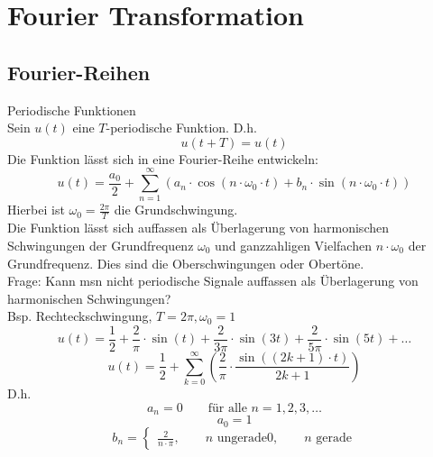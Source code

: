 



\chapter{Fourier Transformation}

\section{Fourier-Reihen}
Periodische Funktionen\\
Sein $u(t)$ eine $T$-periodische Funktion. D.h. 
\[ u(t + T) = u(t) \]
Die Funktion lässt sich in eine Fourier-Reihe entwickeln: 
\[ u(t) = \frac{a_0}{2} + \sum\limits_{n = 1}^{\infty} 
(a_n \cdot \cos(n \cdot \omega_0 \cdot t) 
+ b_n \cdot \sin(n \cdot \omega_0 \cdot t)) \]
Hierbei ist $\omega_0 = \frac{2 \pi}{T}$ die Grundschwingung. \\
Die Funktion lässt sich auffassen als Überlagerung von harmonischen 
Schwingungen der Grundfrequenz $\omega_0$ und ganzzahligen Vielfachen 
$n \cdot \omega_0$ der Grundfrequenz. Dies sind die Oberschwingungen oder 
Obertöne. \\
Frage: Kann msn nicht periodische Signale auffassen als Überlagerung von 
harmonischen Schwingungen? \\
Bsp. Rechteckschwingung, $T = 2 \pi, \omega_0 = 1$\\
\[ u(t) = \frac{1}{2} + \frac{2}{\pi} \cdot \sin(t) 
+ \frac{2}{3\pi} \cdot \sin(3t) 
+ \frac{2}{5\pi} \cdot \sin(5t) + \ldots \]
\[ u(t) = \frac{1}{2} + \sum\limits_{k = 0}^{\infty} 
\left(\frac{2}{\pi} \cdot \frac{\sin((2 k + 1) \cdot t)}{2 k + 1}\right) \]
D.h. 
\[ a_n = 0 \qquad \text{für alle }n = 1, 2, 3, \ldots \]
\[ a_0 = 1 \]
\[ b_n = \left\lbrace
\begin{array}{l}
\frac{2}{n \cdot \pi}, \qquad n \text{ ungerade}
0, \qquad n \text{ gerade}
\end{array}
\right. \]
